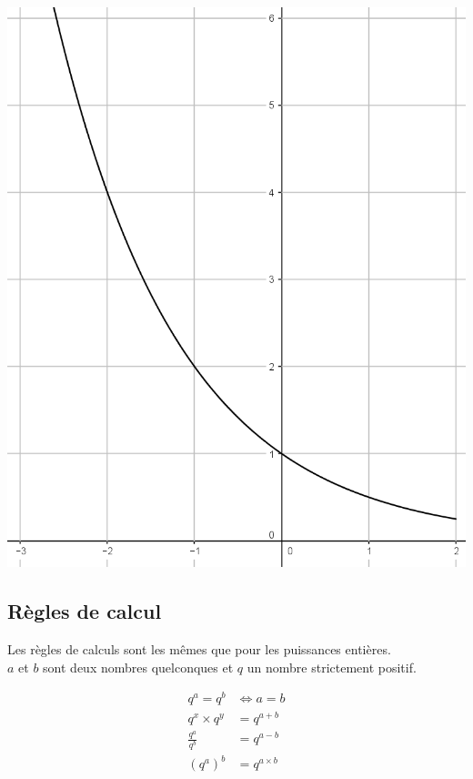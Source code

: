 \documentclass[12pt,a4paper]{article}
\begin{document}
\begin{myex}
\begin{multicols}{2}
		\begin{center}
			\includegraphics[scale=0.25]{./img/var2}
		\end{center}
	\end{multicols}
\end{myex}

\subsection{Règles de calcul}

\begin{myprops}
	Les règles de calculs sont les mêmes que pour les puissances entières.\\
	$a$ et $b$ sont deux nombres quelconques et $q$ un nombre strictement positif.
	
	\begin{align*}
		q^a = q^b &\Leftrightarrow a = b\\
		q^x \times q^y &= q^{a+b}\\
		\frac{q^a}{q^b} &= q^{a-b}\\
		(q^a)^b &= q^{a \times b}
	\end{align*}
\end{myprops}
\end{document}
